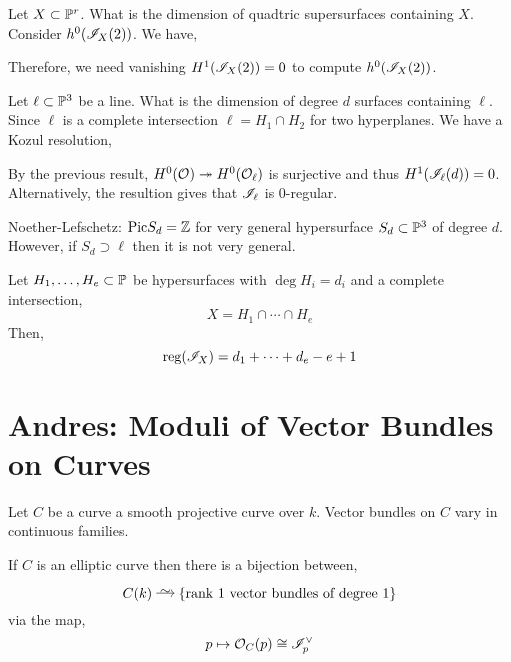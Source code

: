 \documentclass[12pt]{article}
\DeclareMathOperator{\reg}{\mathrm{reg}}
\begin{document}
\begin{example}
Let $X \subset \P^r$. What is the dimension of quadtric supersurfaces containing $X$. Consider $h^0(\I_X(2))$. We have,
\begin{center}
\end{center}
Therefore, we need vanishing $H^1(\I_X(2)) = 0$ to compute $h^0(\I_X(2))$. 
\end{example}

\begin{example}
Let $\ell \subset \P^3$ be a line. What is the dimension of degree $d$ surfaces containing $\ell$. Since $\ell$ is a complete intersection $\ell = H_1 \cap H_2$ for two hyperplanes. We have a Kozul resolution,
\begin{center}
\end{center}
By the previous result, $H^0(\struct{}) \onto H^0(\struct{\ell})$ is surjective and thus $H^1(\I_\ell(d)) = 0$. Alternatively, the resultion gives that $\I_{\ell}$ is $0$-regular.
\end{example}

\begin{example}
Noether-Lefschetz: $\Pic{S_d} = \Z$ for very general hypersurface $S_d \subset \P^3$ of degree $d$. However, if $S_d \supset \ell$ then it is not very general. 
\end{example}

\begin{example}
Let $H_1, \dots, H_e \subset \P$ be hypersurfaces with $\deg{H_i} = d_i$ and a complete intersection,
\[ X = H_1 \cap \cdots \cap H_e \]
Then,
\[ \reg(\I_X) = d_1 + \cdots + d_e - e + 1 \]
\end{example}

\section{Andres: Moduli of Vector Bundles on Curves}

Let $C$ be a curve a smooth projective curve over $k$. Vector bundles on $C$ vary in continuous families.

\begin{example}
If $C$ is an elliptic curve then there is a bijection between,
\[ C(k) \iso \{ \text{rank 1 vector bundles of degree 1} \} \]
via the map,
\[ p \mapsto \struct{C}(p) \cong \I_p^\vee \]
\end{example}
\end{document}
